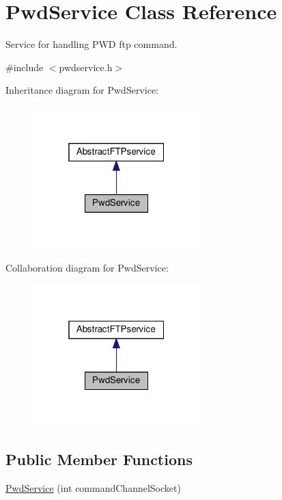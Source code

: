 \hypertarget{classPwdService}{}\section{Pwd\+Service Class Reference}
\label{classPwdService}


Service for handling P\+WD ftp command.  




{\ttfamily \#include $<$pwdservice.\+h$>$}



Inheritance diagram for Pwd\+Service\+:\nopagebreak
\begin{figure}[H]
\begin{center}
\leavevmode
\includegraphics[width=184pt]{de/dce/classPwdService__inherit__graph}
\end{center}
\end{figure}


Collaboration diagram for Pwd\+Service\+:\nopagebreak
\begin{figure}[H]
\begin{center}
\leavevmode
\includegraphics[width=184pt]{d4/de5/classPwdService__coll__graph}
\end{center}
\end{figure}
\subsection*{Public Member Functions}
\begin{DoxyCompactItemize}
\item 
\hyperlink{classPwdService_a5008a00dba5c8867e11196c0c70e6e79}{Pwd\+Service} (int command\+Channel\+Socket)
\end{DoxyCompactItemize}

